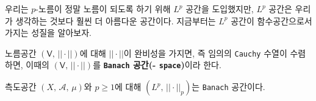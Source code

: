 우리는 $p$-노름이 정말 노름이 되도록 하기 위해 $L^p$ 공간을 도입했지만, $L^p$ 공간은 우리가 생각하는 것보다 훨씬 더 아름다운 공간이다. 지금부터는 $L^p$ 공간이 함수공간으로서 가지는 성질을 알아보자.

\begin{definition}
    노름공간 $(\mathsf{V},\,||\cdot||)$에 대해 $||\cdot||$이 완비성을 가지면, 즉 임의의 \texttt{Cauchy} 수열이 수렴하면, 이때의 $(\mathsf{V},\,||\cdot||)$를 \textbf{\texttt{Banach} 공간(- \texttt{space})}이라 한다.
\end{definition}

\begin{theorem}\label{thm:lpBanach}
    측도공간 $(X,\,\mathcal{A},\,\mu)$와 $p\geq1$에 대해 $(L^p,\,||\cdot||_p)$는 \texttt{Banach} 공간이다.
\end{theorem}

